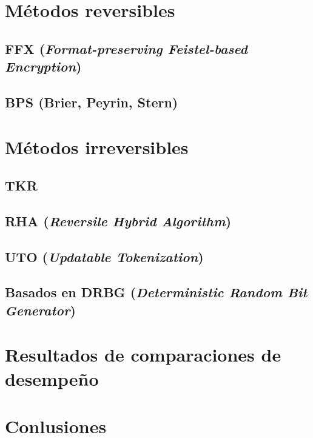 \documentclass[11pt]{llncs}
\begin{document}
  \section{Métodos reversibles}

  \subsection{FFX (\textit{Format-preserving Feistel-based Encryption})}

  \subsection{BPS (Brier, Peyrin, Stern)}

  \section{Métodos irreversibles}

  \subsection{TKR}

  \subsection{RHA (\textit{Reversile Hybrid Algorithm})}

  \subsection{UTO (\textit{Updatable Tokenization})}

  \subsection{Basados en DRBG (\textit{Deterministic Random Bit Generator})}

  \section{Resultados de comparaciones de desempeño}

  \section{Conlusiones}

  
  
\end{document}
